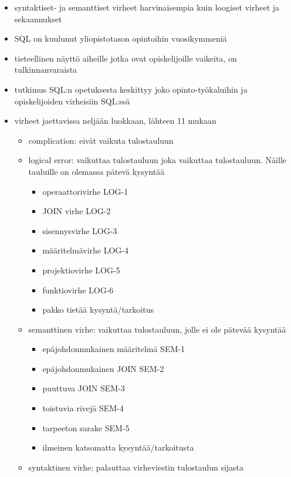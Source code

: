 

\begin{itemize}
    \item syntaktiset- ja semanttiset virheet harvinaisempia kuin loogiset virheet ja sekaannukset
    \item SQL on kuulunut yliopistotason opintoihin vuosikymmeniä
    \item tieteellinen näyttö aiheille jotka ovat opiskelijoille vaikeita, on tulkinnanvaraista
    \item tutkimus SQL:n opetuksesta keskittyy joko opinto-työkaluihin ja opiskelijoiden virheisiin SQL:ssä
    \item virheet jaettavissa neljään luokkaan, lähteen 11 mukaan
    \begin{itemize}
        \item complication: eivät vaikuta tulostauluun
        \item logical error: vaikuttaa tulostauluun joka vaikuttaa tulostauluun. Näille tauluille on olemassa pätevä kysyntää
        \begin{itemize}
            \item operaattorivirhe LOG-1
            \item JOIN virhe LOG-2
            \item sisennysvirhe LOG-3
            \item määritelmävirhe LOG-4
            \item projektiovirhe LOG-5
            \item funktiovirhe LOG-6
            \item pakko tietää kysyntä/tarkoitus
        \end{itemize}
        \item semanttinen virhe: vaikuttaa tulostauluun, jolle ei ole pätevää kysyntää
        \begin{itemize}
            \item epäjohdonmukainen määritelmä SEM-1
            \item epäjohdonmukainen JOIN SEM-2
            \item puuttuva JOIN SEM-3
            \item toistuvia rivejä SEM-4
            \item tarpeeton sarake SEM-5
            \item ilmeinen katsomatta kysyntää/tarkoitusta
        \end{itemize}
        \item syntaktinen virhe: palauttaa virheviestin tulostaulun sijasta

\end{itemize}
\end{itemize}
